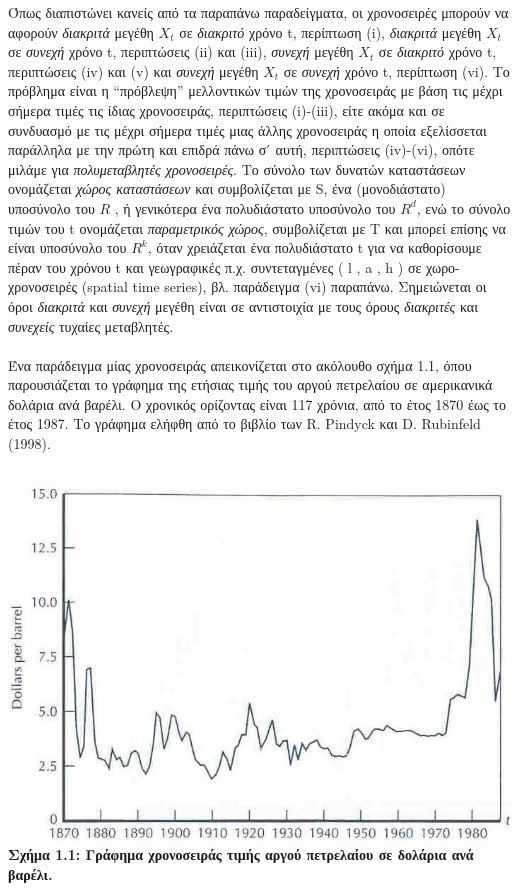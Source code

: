 Όπως διαπιστώνει κανείς από τα παραπάνω παραδείγματα, οι χρονοσειρές μπορούν
να αφορούν \textit{διακριτά} μεγέθη $ X_t $ σε \textit{διακριτό} χρόνο t, περίπτωση (i), \textit{διακριτά} μεγέθη
$ X_t $ σε \textit{συνεχή} χρόνο t, περιπτώσεις (ii) και (iii), \textit{συνεχή} μεγέθη $X_t$ σε \textit{διακριτό} χρόνο t, περιπτώσεις (iv) και (v) και \textit{συνεχή} μεγέθη $X_t$ σε \textit{συνεχή} χρόνο t, περίπτωση (vi).
Το πρόβλημα είναι η “πρόβλεψη” μελλοντικών τιμών της χρονοσειράς με βάση τις
μέχρι σήμερα τιμές τις ίδιας χρονοσειράς, περιπτώσεις (i)-(iii), είτε ακόμα και σε
συνδυασμό με τις μέχρι σήμερα τιμές μιας άλλης χρονοσειράς η οποία εξελίσσεται
παράλληλα με την πρώτη και επιδρά πάνω σ ́ αυτή, περιπτώσεις (iv)-(vi), οπότε
μιλάμε για \textit{πολυμεταβλητές χρονοσειρές}. Το σύνολο των δυνατών καταστάσεων
ονομάζεται \textit{χώρος καταστάσεων} και συμβολίζεται με S, ένα (μονοδιάστατο)
υποσύνολο του  $ R $   , ή γενικότερα ένα πολυδιάστατο υποσύνολο του $ R^d $, ενώ το
σύνολο τιμών του t ονομάζεται \textit{παραμετρικός χώρος}, συμβολίζεται με Τ και μπορεί
επίσης να είναι υποσύνολο του $ R^k $, όταν χρειάζεται ένα πολυδιάστατο t για να
καθορίσουμε πέραν του χρόνου t και γεωγραφικές π.χ. συντεταγμένες ( l , a , h ) σε
χωρο-χρονοσειρές (spatial time series), βλ. παράδειγμα (vi) παραπάνω. Σημειώνεται
οι όροι \textit{διακριτά} και \textit{συνεχή} μεγέθη είναι σε αντιστοιχία με τους όρους \textit{διακριτές} και
\textit{συνεχείς} τυχαίες μεταβλητές. \\ \\
Ένα παράδειγμα μίας χρονοσειράς απεικονίζεται στο ακόλουθο σχήμα 1.1, όπου παρουσιάζεται το γράφημα
της ετήσιας τιμής του αργού πετρελαίου σε αμερικανικά δολάρια ανά βαρέλι. Ο χρονικός ορίζοντας είναι 117 χρόνια, από το έτος 1870 έως το έτος 1987. Το γράφημα ελήφθη από το βιβλίο των R. Pindyck και
D. Rubinfeld (1998).\\\\
\begin{center}
\includegraphics[scale=0.4]{graf1.png}\\   
\textbf{Σχήμα 1.1: Γράφημα χρονοσειράς τιμής αργού πετρελαίου σε δολάρια ανά βαρέλι.}
\end{center} 
\linespread{1}



